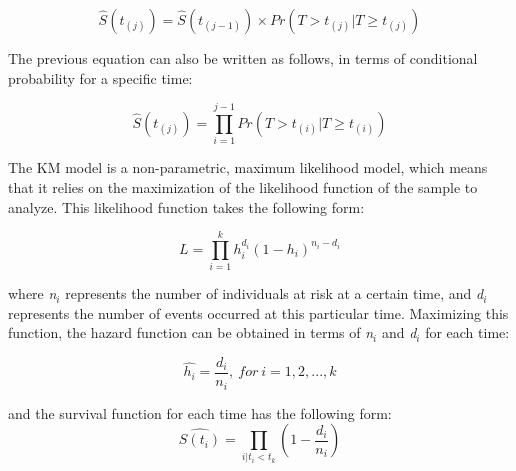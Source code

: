 \documentclass[11pt]{book} %
\begin{document}
    \begin{equation}
      \widehat{S}(t_{(j)}) = \widehat{S}(t_{(j-1)}) \times Pr(T>t_{(j)}|T \geq t_{(j)})
      \label{eq:KM-eq-surv}
    \end{equation}

    The previous equation can also be written as follows, in terms of conditional probability for a specific time:

    \begin{equation}
      \widehat{S}(t_{(j)}) = \prod_{i=1}^{j-1} Pr(T>t_{(i)}|T\geq t_{(i)})
      \label{eq:KM-eq-probab}
    \end{equation}

    The KM model is a non-parametric, maximum likelihood model, which means that it relies on the maximization of the likelihood function of the sample to analyze. This likelihood function takes the following form:

    \begin{equation}
      L = \prod_{i=1}^k h_i^{d_i}(1-h_i)^{n_i-d_i}
      \label{eq:km-likelihood-function}
    \end{equation}

    where \emph{n$_i$} represents the number of individuals at risk at a certain time, and \emph{d$_i$} represents the number of events occurred at this particular time. Maximizing this function, the hazard function can be obtained in terms of \emph{n$_i$} and \emph{d$_i$} for each time:

    \begin{equation}
      \widehat{h_i}=\frac{d_i}{n_i}, \ for \ i = 1,2,...,k
      \label{eq:km-hazard-function}
    \end{equation}

    and the survival function for each time has the following form:
    \begin{equation}
      \widehat{S(t_i)} = \prod_{i | t_i < t_k}(1 - \frac{d_i}{n_i})
      \label{eq:km-survival-function}
    \end{equation}
\end{document}
